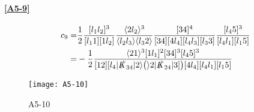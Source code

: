 \paragraph{\ref{A5-9}}
\begin{equation*}
\begin{split}
c_9 = & \frac{1}{2}\frac{[l_1 l_2]^3}{[l_1 1][1 l_2]}
\frac{\langle 2l_2 \rangle^3}{\langle l_2 l_3 \rangle\langle l_3 2 \rangle}
\frac{[34]^4}{[34][4 l_4][l_4 l_3][l_3 3]}
\frac{[l_4 5]^3}{[l_4 l_1][l_1 5]}
\\
= &
-\frac{1}{2}
\frac{\langle 21 \rangle^3 [1l_1]^2[34]^3[l_4 5]^3}{[12][l_4|\slashed{K}_{34}|2\rangle \big(\rangle 2 | \slashed{K}_{24}|3]\big) [4l_4][l_4 l_1 ][l_1 5]}
\end{split}
\end{equation*}
%
\fi %
%
\begin{figure}
  \centering
    \texttt{[image: A5-10]}
    \caption{A5-10}
  \label{A5-10}
\end{figure}

